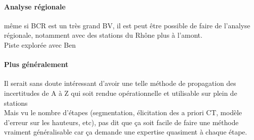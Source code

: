 	\paragraph{Analyse régionale} même si BCR est un très grand BV, il est peut être possible de faire de l'analyse régionale, notamment avec des stations du Rhône plus à l'amont.\\
	Piste explorée avec Ben
	
	\paragraph{Plus généralement} Il serait sans doute intéressant d'avoir une telle méthode de propagation des incertitudes de A à Z qui soit rendue opérationnelle et utilisable sur plein de stations\\
	Mais vu le nombre d'étapes (segmentation, élicitation des a priori CT, modèle d'erreur sur les hauteurs, etc), pas dit que ça soit facile de faire une méthode vraiment généralisable car ça demande une expertise quasiment à chaque étape.	
	
	


